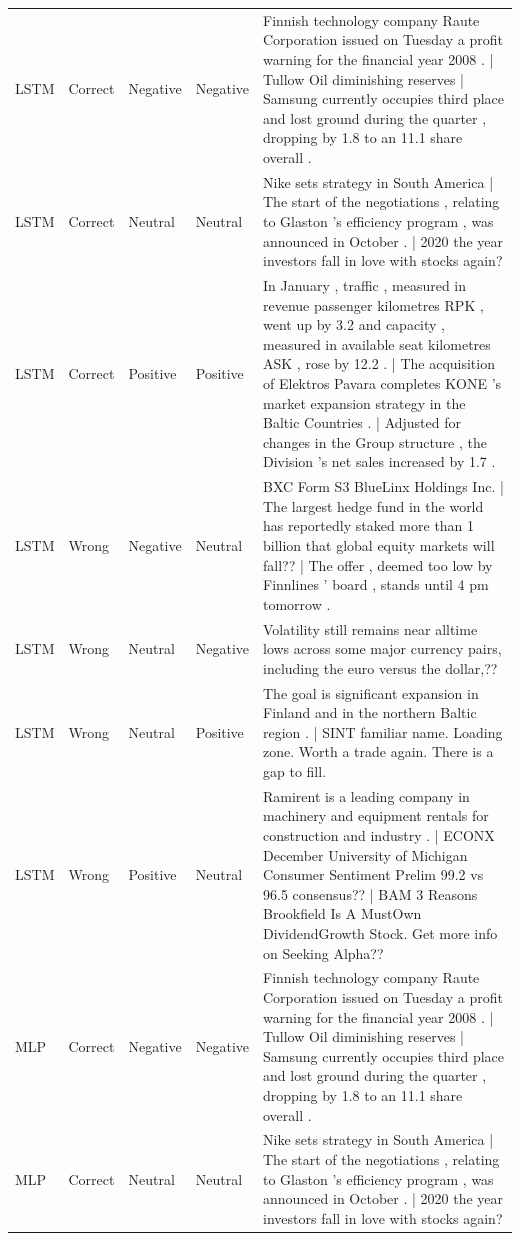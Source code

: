 \begin{longtable}{p{1.8cm}p{1.5cm}p{1.8cm}p{1.8cm}p{16.5cm}}
LSTM & Correct & Negative & Negative & Finnish technology company Raute Corporation issued on Tuesday a profit warning for the financial year 2008 .    |   Tullow Oil diminishing reserves    |   Samsung currently occupies third place and lost ground during the quarter , dropping by 1.8 to an 11.1 share overall . \\
LSTM & Correct & Neutral & Neutral & Nike sets strategy in South America    |   The start of the negotiations , relating to Glaston 's efficiency program , was announced in October .    |   2020 the year investors fall in love with stocks again? \\
LSTM & Correct & Positive & Positive & In January , traffic , measured in revenue passenger kilometres RPK , went up by 3.2 and capacity , measured in available seat kilometres ASK , rose by 12.2 .    |   The acquisition of Elektros Pavara completes KONE 's market expansion strategy in the Baltic Countries .    |   Adjusted for changes in the Group structure , the Division 's net sales increased by 1.7 . \\
LSTM & Wrong & Negative & Neutral & BXC Form S3 BlueLinx Holdings Inc.    |   The largest hedge fund in the world has reportedly staked more than 1 billion that global equity markets will fall??    |   The offer , deemed too low by Finnlines ' board , stands until 4 pm tomorrow . \\
LSTM & Wrong & Neutral & Negative & Volatility still remains near alltime lows across some major currency pairs, including the euro versus the dollar,?? \\
LSTM & Wrong & Neutral & Positive & The goal is significant expansion in Finland and in the northern Baltic region .    |   SINT familiar name. Loading zone. Worth a trade again. There is a gap to fill. \\
LSTM & Wrong & Positive & Neutral & Ramirent is a leading company in machinery and equipment rentals for construction and industry .    |   ECONX December University of Michigan Consumer Sentiment Prelim 99.2 vs 96.5 consensus??    |   BAM 3 Reasons Brookfield Is A MustOwn DividendGrowth Stock. Get more info on Seeking Alpha?? \\
MLP & Correct & Negative & Negative & Finnish technology company Raute Corporation issued on Tuesday a profit warning for the financial year 2008 .    |   Tullow Oil diminishing reserves    |   Samsung currently occupies third place and lost ground during the quarter , dropping by 1.8 to an 11.1 share overall . \\
MLP & Correct & Neutral & Neutral & Nike sets strategy in South America    |   The start of the negotiations , relating to Glaston 's efficiency program , was announced in October .    |   2020 the year investors fall in love with stocks again? \\

\end{longtable}
